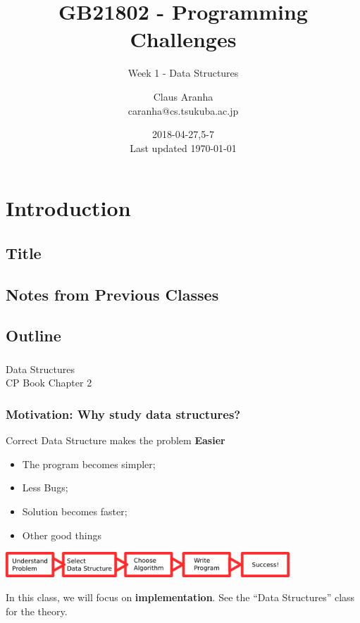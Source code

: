\documentclass{beamer}
\title[GB21802]{GB21802 - Programming Challenges}
\subtitle[]{Week 1 - Data Structures}
\author[Claus Aranha]{Claus Aranha\\{\footnotesize caranha@cs.tsukuba.ac.jp}}
\institute{College of Information Science}
\date{2018-04-27,5-7\\{\tiny Last updated \today}}
\begin{document}
\section{Introduction}
\subsection{Title}
\begin{frame}
\maketitle
\end{frame}

\subsection{Notes from Previous Classes}



\subsection{Outline}

\begin{frame}
  \frametitle{}

  \begin{center}
    {\large Data Structures}\\
    CP Book Chapter 2
  \end{center}
\end{frame}


\begin{frame}
  \frametitle{Motivation: Why study data structures?}

  \begin{block}{Correct Data Structure makes the problem {\bf Easier}}
    \begin{itemize}
    \item The program becomes simpler;
    \item Less Bugs;
    \item Solution becomes faster;
    \item Other good things
    \end{itemize}
  \end{block}

  \bigskip

  \begin{center}
    \includegraphics[width=0.8\textwidth]{../img/pipeline}
  \end{center}

  \bigskip

  In this class, we will focus on {\bf implementation}. See the ``Data
  Structures'' class for the theory.  
\end{frame}
\end{document}

